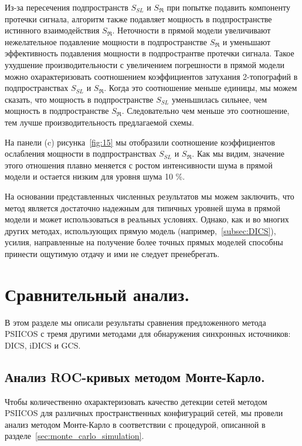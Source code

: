 Из-за пересечения подпространств $S_{SL}$ и $S_{\Re} $ при попытке
подавить компоненту протечки сигнала, алгоритм также подавляет мощность в
подпространстве истинного взаимодействия $S_{\Re}$. Неточности в прямой модели
увеличивают нежелательное подавление мощности в подпространстве $S_{\Re} $ и уменьшают
эффективность подавления мощности в подпространтве протечки сигнала.
Такое ухудшение производительности с увеличением погрешности в прямой модели
можно охарактеризовать соотношением коэффициентов затухания 2-топографий в подпространствах $S_{SL}$ и $S_{\Re}$.
Когда это соотношение меньше единицы, мы можем сказать, что мощность в подпространстве $S_{SL}$
уменьшилась сильнее, чем мощность в подпространстве $ S_{\Re}$. Следовательно
чем меньше это соотношение, тем лучше производительность предлагаемой схемы.

На панели (c) рисунка~\ref{fig:15} мы отобразили соотношение коэффициентов ослабления мощности в подпространствах
$S_{SL}$ и $ S_{\Re}$. Как мы видим, значение этого отношения плавно меняется с
ростом интенсивности шума в прямой модели и остается низким для уровня шума 10 \%.

На основании представленных численных результатов мы можем заключить, что метод
является достаточно надежным для типичных уровней шума в прямой модели и может
использоваться в реальных условиях.  Однако, как и во многих других методах,
использующих прямую модель (например,~\ref{subsec:DICS}), усилия, направленные на
получение более точных прямых моделей способны принести ощутимую отдачу и ими
не следует пренебрегать.

\section{Сравнительный анализ.}

 В этом разделе мы описали результаты сравнения предложенного метода PSIICOS
 с тремя другими методами для обнаружения синхронных источников: DICS, iDICS и GCS.\@

\subsection{Анализ ROC-кривых методом Монте-Карло.}
Чтобы количественно охарактеризовать качество детекции сетей методом PSIICOS для различных
пространственных конфигураций сетей, мы провели анализ методом Монте-Карло в соответствии
с процедурой, описанной в разделе~\ref{sec:monte_carlo_simulation}.

